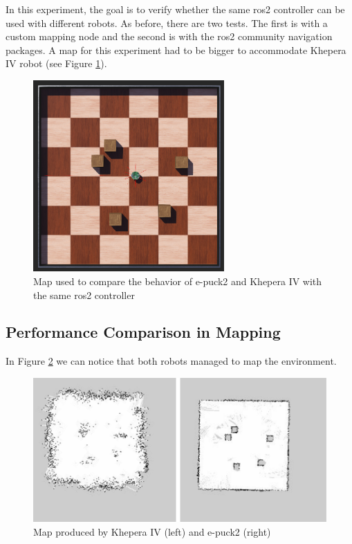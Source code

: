 In this experiment, the goal is to verify whether the same \ac{ros2} controller can be used with different robots.
As before, there are two tests.
The first is with a custom mapping node and the second is with the \ac{ros2} community navigation packages.
A map for this experiment had to be bigger to accommodate Khepera IV robot (see Figure \ref{fig:results:map_epuck_vs_khepera}).

\begin{figure}[H]
    \centering
    \includegraphics[width=0.65\textwidth]{./results/figures/map_epuck_vs_khepera.png}
    \caption{Map used to compare the behavior of e-puck2 and Khepera IV with the same \ac{ros2} controller}
    \label{fig:results:map_epuck_vs_khepera}
\end{figure}

\subsection{Performance Comparison in Mapping}

In Figure \ref{fig:results:epuck2_vs_khepera4_map_results} we can notice that both robots managed to map the environment.

\begin{figure}[H]
    \centering
    \includegraphics[width=\textwidth]{./results/figures/epuck2_vs_khepera4_map_results}
    \caption{Map produced by Khepera IV (left) and e-puck2 (right)}
    \label{fig:results:epuck2_vs_khepera4_map_results}
\end{figure}

